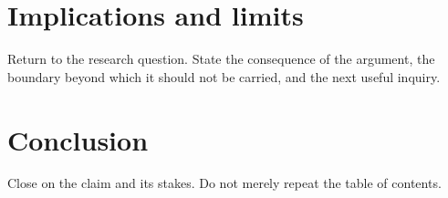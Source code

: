 \section{Implications and limits}\label{sec:implications}

Return to the research question. State the consequence of the argument, the
boundary beyond which it should not be carried, and the next useful inquiry.

\section{Conclusion}\label{sec:conclusion}

Close on the claim and its stakes. Do not merely repeat the table of contents.
